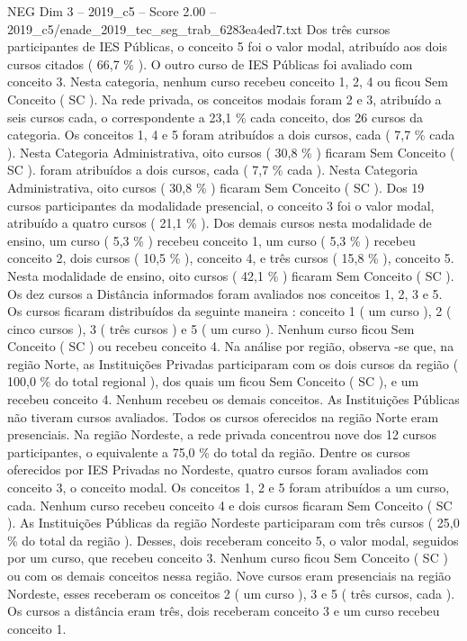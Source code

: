 \begin{textsample}{NEG Dim 3 – 2019\_c5 – Score 2.00 – 2019\_c5/enade\_2019\_tec\_seg\_trab\_6283ea4ed7.txt}
Dos três cursos participantes de IES Públicas, o conceito 5 foi o valor modal, atribuído aos dois cursos citados ( 66,7 \% ).
O outro curso de IES Públicas foi avaliado com conceito 3.
Nesta categoria, nenhum curso recebeu conceito 1, 2, 4 ou ficou Sem Conceito ( SC ).
Na rede privada, os conceitos modais foram 2 e 3, atribuído a seis cursos cada, o correspondente a 23,1 \% cada conceito, dos 26 cursos da categoria.
Os conceitos 1, 4 e 5 foram atribuídos a dois cursos, cada ( 7,7 \% cada ).
Nesta Categoria Administrativa, oito cursos ( 30,8 \% ) ficaram Sem Conceito ( SC ). foram atribuídos a dois cursos, cada ( 7,7 \% cada ).
Nesta Categoria Administrativa, oito cursos ( 30,8 \% ) ficaram Sem Conceito ( SC ).
Dos 19 cursos participantes da modalidade presencial, o conceito 3 foi o valor modal, atribuído a quatro cursos ( 21,1 \% ).
Dos demais cursos nesta modalidade de ensino, um curso ( 5,3 \% ) recebeu conceito 1, um curso ( 5,3 \% ) recebeu conceito 2, dois cursos ( 10,5 \% ), conceito 4, e três cursos ( 15,8 \% ), conceito 5.
Nesta modalidade de ensino, oito cursos ( 42,1 \% ) ficaram Sem Conceito ( SC ).
Os dez cursos a Distância informados foram avaliados nos conceitos 1, 2, 3 e 5.
Os cursos ficaram distribuídos da seguinte maneira : conceito 1 ( um curso ), 2 ( cinco cursos ), 3 ( três cursos ) e 5 ( um curso ).
Nenhum curso ficou Sem Conceito ( SC ) ou recebeu conceito 4.
Na análise por região, observa -se que, na região Norte, as Instituições Privadas participaram com os dois cursos da região ( 100,0 \% do total regional ), dos quais um ficou Sem Conceito ( SC ), e um recebeu conceito 4.
Nenhum recebeu os demais conceitos.
As Instituições Públicas não tiveram cursos avaliados.
Todos os cursos oferecidos na região Norte eram presenciais.
Na região Nordeste, a rede privada concentrou nove dos 12 cursos participantes, o equivalente a 75,0 \% do total da região.
Dentre os cursos oferecidos por IES Privadas no Nordeste, quatro cursos foram avaliados com conceito 3, o conceito modal.
Os conceitos 1, 2 e 5 foram atribuídos a um curso, cada.
Nenhum curso recebeu conceito 4 e dois cursos ficaram Sem Conceito ( SC ).
As Instituições Públicas da região Nordeste participaram com três cursos ( 25,0 \% do total da região ).
Desses, dois receberam conceito 5, o valor modal, seguidos por um curso, que recebeu conceito 3.
Nenhum curso ficou Sem Conceito ( SC ) ou com os demais conceitos nessa região.
Nove cursos eram presenciais na região Nordeste, esses receberam os conceitos 2 ( um curso ), 3 e 5 ( três cursos, cada ).
Os cursos a distância eram três, dois receberam conceito 3 e um curso recebeu conceito 1.

\end{textsample}
